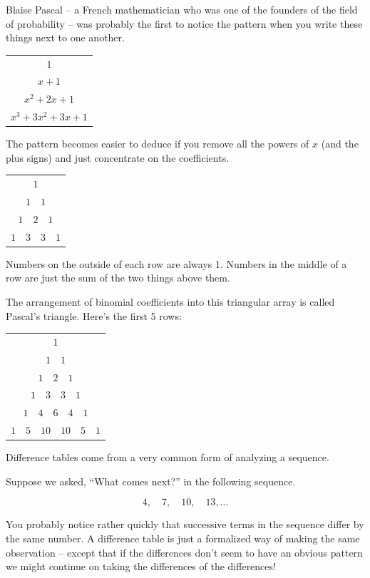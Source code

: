 Blaise Pascal -- a French mathematician who was one of the founders of the field of probability -- was probably the first to notice the pattern when you write these things next to one another.


\begin{tabular}{c}
	$1$ \\
	$x+1$ \\
	$x^2+2x+1$ \\
	$x^3 + 3x^2 + 3x+1$\\
\end{tabular}

The pattern becomes easier to deduce if you remove all the powers of $x$ (and the plus signs) and just concentrate on the coefficients.

\begin{tabular}{c}
	$1$ \\
	$1 \quad 1$ \\
	$1 \quad 2 \quad 1$ \\
	$1 \quad 3 \quad 3 \quad 1$\\
\end{tabular}

 Numbers on the outside of each row are always 1.  Numbers in the middle of a row are just the sum of the two things above them.
 
 The arrangement of binomial coefficients into this triangular array is called Pascal's triangle.  Here's the first 5 rows:
 
 \begin{tabular}{c}
 	$1$ \\
 	$1 \quad 1$ \\
 	$1 \quad 2 \quad 1$ \\
 	$1 \quad 3 \quad 3 \quad 1$\\
 	$1 \quad 4 \quad 6 \quad 4 \quad 1$\\
 	$1 \quad 5 \quad 10 \quad 10 \quad 5 \quad 1$\\
 \end{tabular}
 
 Difference tables come from a very common form of analyzing a sequence.
 
 Suppose we asked, ``What comes next?'' in the following sequence.
 
 \[ 4, \quad 7, \quad 10, \quad 13, \ldots \]
 
 You probably notice rather quickly that successive terms in the sequence differ by the same number.  A difference table is just a formalized way of making the same observation -- except that if the differences don't seem to have an obvious pattern we might continue on taking the differences of the differences!
 
